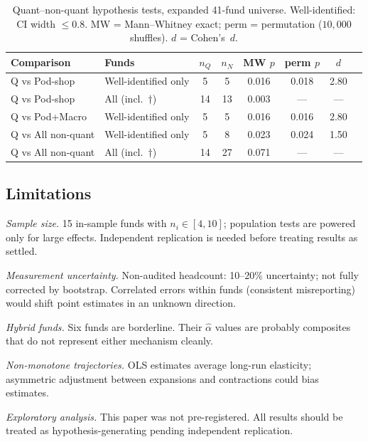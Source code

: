 \documentclass[10pt,onecolumn]{article}
\newcommand{\alphahat}{\hat{\alpha}}
\begin{document}
\begin{table}[htbp]
\caption{\label{tab:expanded_tests}
  Quant--non-quant hypothesis tests, expanded 41-fund universe.
  Well-identified: CI width $\leq 0.8$.
  MW = Mann--Whitney exact; perm = permutation ($10{,}000$ shuffles).
  $d$ = Cohen's~$d$.
}
\setlength{\tabcolsep}{4pt}
\small
\begin{tabular}{@{}llcccccc@{}}
  \toprule
  Comparison & Funds & $n_Q$ & $n_N$ & MW $p$ & perm $p$ & $d$ \\
  \midrule
  Q vs Pod-shop       & Well-identified only & 5 & 5 & 0.016 & 0.018 & 2.80 \\
  Q vs Pod-shop       & All (incl.\ $\dagger$) & 14 & 13 & 0.003 & --- & --- \\
  Q vs Pod+Macro      & Well-identified only & 5 & 5 & 0.016 & 0.016 & 2.80 \\
  Q vs All non-quant  & Well-identified only & 5 & 8 & 0.023 & 0.024 & 1.50 \\
  Q vs All non-quant  & All (incl.\ $\dagger$) & 14 & 27 & 0.071 & --- & --- \\
  \bottomrule
\end{tabular}
\end{table}

\subsection{Limitations}

\noindent\textit{Sample size.}
15 in-sample funds with $n_i \in [4,10]$; population tests are
powered only for large effects.
Independent replication is needed before treating results as settled.

\noindent\textit{Measurement uncertainty.}
Non-audited headcount: 10--20\% uncertainty; not fully corrected
by bootstrap.
Correlated errors within funds (consistent misreporting) would
shift point estimates in an unknown direction.

\noindent\textit{Hybrid funds.}
Six funds are borderline.
Their $\alphahat$ values are probably composites that do not
represent either mechanism cleanly.

\noindent\textit{Non-monotone trajectories.}
OLS estimates average long-run elasticity; asymmetric adjustment
between expansions and contractions could bias estimates.

\noindent\textit{Exploratory analysis.}
This paper was not pre-registered.
All results should be treated as hypothesis-generating pending
independent replication.
\end{document}
